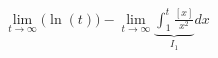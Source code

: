 \documentclass[preview]{standalone}
\begin{document}
\begin{align*}
\lim_{t\to\infty} \bigg(\ln(t)\bigg)- \lim_{t\to\infty}\underbrace{ \int_{1}^{t}\frac{[x]}{x^2} }_{I_{1} }dx
\end{align*}
\end{document}

